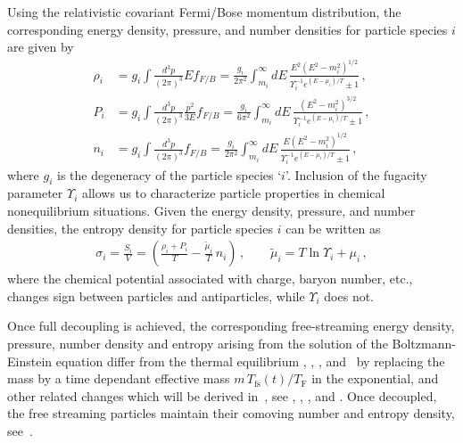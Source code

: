 Using the relativistic covariant Fermi/Bose momentum distribution, the corresponding energy density, pressure, and number densities for particle species $i$ are given by
\begin{align}
\rho_i&=g_i\int\!\!\frac{d^3p}{(2\pi)^3}Ef_{F/B}=\frac{g_i}{2\pi^2}\!\int_{m_i}^\infty\!\!\!dE\,\frac{E^2\left(E^2-m_i^2\right)^{1/2}}{\Upsilon_i^{-1}e^{(E-\mu_i)/T}\pm 1}\,,\label{energy_density}\\[0.2cm]
P_i&=g_i\int\!\!\frac{d^3p}{(2\pi)^3}\frac{p^2}{3E}f_{F/B}=\frac{g_i}{6\pi^2}\!\int_{m_i}^\infty\!\!\!dE\,\frac{\left(E^2-m_i^2\right)^{3/2}}{\Upsilon_i^{-1} e^{(E-\mu_i)/T}\pm 1}\,,\label{Pressure_density}\\[0.2cm]
n_i&=g_i\int\!\!\frac{d^3p}{(2\pi)^3}f_{F/B}=\frac{g_i}{2\pi^2}\!\int_{m_i}^\infty\!\!\!dE\,\frac{E(E^2-m_i^2)^{1/2} }{\Upsilon_i^{-1}e^{(E-\mu_i)/T}\pm 1}\,,
\label{number_density}
\end{align}
where $g_i$ is the degeneracy of the particle species `$i$'. Inclusion of the fugacity parameter $\Upsilon_i$ allows us to characterize particle properties in chemical nonequilibrium situations. Given the energy density, pressure, and number densities, the entropy density for particle species $i$ can be written as 
\begin{align}\label{entropy}
\sigma_i=\frac{S_i}{V}=\left(\frac{\rho_i+P_i}{T}-\frac{\tilde \mu_i}{T}\,n_i\right)\,,\qquad
\tilde \mu_i=T\ln \Upsilon_i +\mu_i\,,
\end{align}
where the chemical potential associated with charge, baryon number, etc., changes sign between particles and antiparticles, while $\Upsilon_i$ does not.

Once full decoupling is achieved, the corresponding free-streaming energy density, pressure, number density and entropy arising from the solution of the Boltzmann-Einstein equation differ from the thermal equilibrium , , , and~ by replacing the mass by a time dependant effective mass $m\,T_\mathrm{fs}(t)/T_\mathrm{F}$ in the exponential, and other related changes which will be derived in~, see , , , and . Once decoupled, the free streaming particles maintain their comoving number and entropy density, see~.


